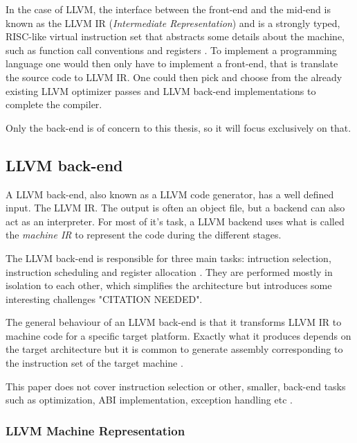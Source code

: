 In the case of LLVM, the interface between the front-end and the mid-end is known as the
LLVM IR (\textit{Intermediate Representation}) and is a strongly typed, RISC-like virtual
instruction set that abstracts some details about the machine, such as function call
conventions and registers \cite[Section~11.3]{aosa-llvm}. To implement a programming language
one would then only have to implement a front-end, that is translate the source code to
LLVM IR. One could then pick and choose from the already existing LLVM optimizer passes
and LLVM back-end implementations to complete the compiler\cite[Section~11.5]{aosa-llvm}.

Only the back-end is of concern to this thesis, so it will focus exclusively on that.

\subsection{LLVM back-end}

A LLVM back-end, also known as a LLVM code generator, has a well defined input. The
LLVM IR\cite[Section~11.4.1]{aosa-llvm}. The output is often an object file, but a backend
can also act as an interpreter. For most of it's task, a LLVM backend uses what is called
the \textit{machine IR} to represent the code during the different stages.

The LLVM back-end is responsible for three main tasks: intruction selection, instruction
scheduling and register allocation \cite{llvm-writing-backend, llvm-codegenerator-highlevel}.
They are performed mostly in isolation to each other, which simplifies the architecture
but introduces some interesting challenges "CITATION NEEDED".

The general behaviour of an LLVM back-end is that it transforms LLVM IR to machine code
for a specific target platform. Exactly what it produces depends on the target architecture
but it is common to generate assembly corresponding to the instruction set of the target
machine \cite[Section~11.5]{aosa-llvm}.

This paper does not cover instruction selection or other, smaller, back-end tasks such as
optimization, ABI implementation, exception handling etc \cite[at~1:47]{welcome-to-backend}.

\subsubsection{LLVM Machine Representation}

